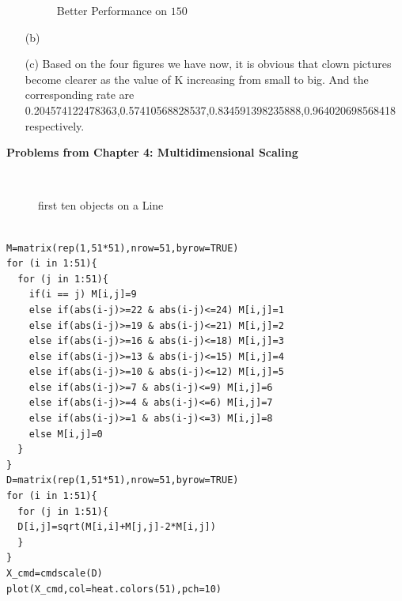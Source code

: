 \documentclass[12pt]{article}
\begin{document}
\begin{itemize}
\begin{figure}
\caption{Better Performance on $150$}
    \label{fig:matlabclownK150}
\end{figure}

\item[(b)]

\item[(c)]
Based on the four figures we have now, it is obvious that clown pictures become clearer as the value of K increasing from small to big. And the corresponding rate are 0.204574122478363,0.57410568828537,0.834591398235888,0.964020698568418 respectively.
\end{itemize}

\vskip0.25in
\begin{center}
\textbf{Problems from Chapter 4: Multidimensional Scaling}
\end{center}

\newpage
{}\\
\begin{figure}[h!]
    \centering
{}
\caption{first ten objects on a Line}
\label{fig:tenobjects}
\end{figure}
\begin{lstlisting}[caption=R codes, label={code:}]

M=matrix(rep(1,51*51),nrow=51,byrow=TRUE)
for (i in 1:51){
  for (j in 1:51){
    if(i == j) M[i,j]=9
    else if(abs(i-j)>=22 & abs(i-j)<=24) M[i,j]=1
    else if(abs(i-j)>=19 & abs(i-j)<=21) M[i,j]=2
    else if(abs(i-j)>=16 & abs(i-j)<=18) M[i,j]=3
    else if(abs(i-j)>=13 & abs(i-j)<=15) M[i,j]=4
    else if(abs(i-j)>=10 & abs(i-j)<=12) M[i,j]=5
    else if(abs(i-j)>=7 & abs(i-j)<=9) M[i,j]=6
    else if(abs(i-j)>=4 & abs(i-j)<=6) M[i,j]=7
    else if(abs(i-j)>=1 & abs(i-j)<=3) M[i,j]=8
    else M[i,j]=0
  }
}
D=matrix(rep(1,51*51),nrow=51,byrow=TRUE)
for (i in 1:51){
  for (j in 1:51){
  D[i,j]=sqrt(M[i,i]+M[j,j]-2*M[i,j])
  }
}
X_cmd=cmdscale(D)
plot(X_cmd,col=heat.colors(51),pch=10)
\end{lstlisting}
\end{document}
